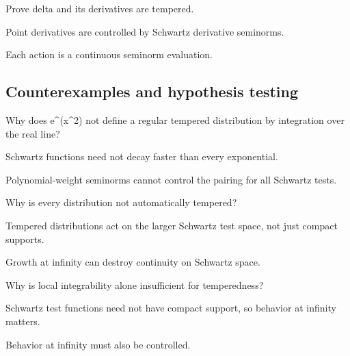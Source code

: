 \begin{exercise}\label{exr:iii18-expand-09}
Prove delta and its derivatives are tempered.
\end{exercise}
\begin{hint}
Point derivatives are controlled by Schwartz derivative seminorms.
\end{hint}
\begin{solution}
Each action is a continuous seminorm evaluation.
\end{solution}

\subsection*{Counterexamples and hypothesis testing}

\begin{exercise}\label{exr:iii18-expand-10}
Why does e\textasciicircum{}(x\textasciicircum{}2) not define a regular tempered distribution by integration over the real line?
\end{exercise}
\begin{hint}
Schwartz functions need not decay faster than every exponential.
\end{hint}
\begin{solution}
Polynomial-weight seminorms cannot control the pairing for all Schwartz tests.
\end{solution}

\begin{exercise}\label{exr:iii18-expand-11}
Why is every distribution not automatically tempered?
\end{exercise}
\begin{hint}
Tempered distributions act on the larger Schwartz test space, not just compact supports.
\end{hint}
\begin{solution}
Growth at infinity can destroy continuity on Schwartz space.
\end{solution}

\begin{exercise}\label{exr:iii18-expand-12}
Why is local integrability alone insufficient for temperedness?
\end{exercise}
\begin{hint}
Schwartz test functions need not have compact support, so behavior at infinity matters.
\end{hint}
\begin{solution}
Behavior at infinity must also be controlled.
\end{solution}

